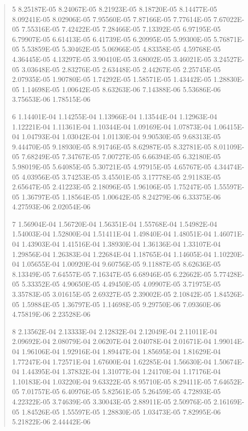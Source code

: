 \documentclass[letterpaper,10pt,english]{sphinxmanual}
\begin{document}
\begin{quote}
\begin{DUlineblock}{0em}
\begin{DUlineblock}{\DUlineblockindent}
\item[] 5   8.25187E-05  8.24067E-05  8.21923E-05  8.18720E-05  8.14477E-05  8.09241E-05  8.02906E-05  7.95560E-05  7.87166E-05  7.77614E-05  7.67022E-05  7.55316E-05  7.42422E-05  7.28466E-05  7.13392E-05  6.97195E-05  6.79907E-05  6.61413E-05  6.41739E-05  6.20995E-05  5.99300E-05  5.76871E-05  5.53859E-05  5.30462E-05  5.06966E-05  4.83358E-05  4.59768E-05  4.36445E-05  4.13297E-05  3.90410E-05  3.68002E-05  3.46021E-05  3.24527E-05  3.03648E-05  2.83276E-05  2.63448E-05  2.44267E-05  2.25745E-05  2.07935E-05  1.90780E-05  1.74292E-05  1.58571E-05  1.43442E-05  1.28830E-05  1.14698E-05  1.00642E-05  8.63263E-06  7.14388E-06  5.53686E-06  3.75653E-06  1.78515E-06
\item[] 6   1.14401E-04  1.14255E-04  1.13966E-04  1.13544E-04  1.12963E-04  1.12221E-04  1.11361E-04  1.10344E-04  1.09169E-04  1.07873E-04  1.06415E-04  1.04793E-04  1.03042E-04  1.01130E-04  9.90530E-05  9.68313E-05  9.44470E-05  9.18930E-05  8.91746E-05  8.62987E-05  8.32781E-05  8.01109E-05  7.68249E-05  7.34767E-05  7.00727E-05  6.66394E-05  6.32180E-05  5.98019E-05  5.64085E-05  5.30721E-05  4.97915E-05  4.65767E-05  4.34474E-05  4.03956E-05  3.74253E-05  3.45501E-05  3.17778E-05  2.91183E-05  2.65647E-05  2.41223E-05  2.18096E-05  1.96106E-05  1.75247E-05  1.55597E-05  1.36797E-05  1.18564E-05  1.00642E-05  8.24279E-06  6.33375E-06  4.27593E-06  2.02054E-06
\item[] 7   1.56904E-04  1.56720E-04  1.56351E-04  1.55768E-04  1.54982E-04  1.54003E-04  1.52800E-04  1.51411E-04  1.49840E-04  1.48051E-04  1.46071E-04  1.43903E-04  1.41516E-04  1.38930E-04  1.36136E-04  1.33107E-04  1.29856E-04  1.26383E-04  1.22684E-04  1.18765E-04  1.14605E-04  1.10220E-04  1.05655E-04  1.00920E-04  9.60756E-05  9.11887E-05  8.62636E-05  8.13349E-05  7.64557E-05  7.16347E-05  6.68946E-05  6.22662E-05  5.77428E-05  5.33352E-05  4.90650E-05  4.49450E-05  4.09907E-05  3.71975E-05  3.35783E-05  3.01615E-05  2.69327E-05  2.39002E-05  2.10842E-05  1.84526E-05  1.59884E-05  1.36797E-05  1.14698E-05  9.29750E-06  7.09360E-06  4.75819E-06  2.23528E-06
\item[] 8   2.13562E-04  2.13333E-04  2.12832E-04  2.12049E-04  2.11011E-04  2.09692E-04  2.08079E-04  2.06207E-04  2.04078E-04  2.01671E-04  1.99014E-04  1.96106E-04  1.92916E-04  1.89447E-04  1.85695E-04  1.81629E-04  1.77247E-04  1.72571E-04  1.67600E-04  1.62285E-04  1.56630E-04  1.50674E-04  1.44395E-04  1.37832E-04  1.31077E-04  1.24170E-04  1.17176E-04  1.10183E-04  1.03220E-04  9.63322E-05  8.95710E-05  8.29411E-05  7.64652E-05  7.01757E-05  6.40976E-05  5.82561E-05  5.26459E-05  4.72893E-05  4.22322E-05  3.74639E-05  3.30043E-05  2.88911E-05  2.50976E-05  2.16169E-05  1.84526E-05  1.55597E-05  1.28830E-05  1.03473E-05  7.82995E-06  5.21822E-06  2.44442E-06

\end{DUlineblock}
\end{DUlineblock}
\end{quote}
\end{document}
